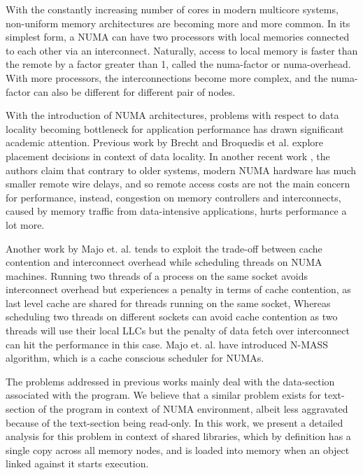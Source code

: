 
With the constantly increasing number of cores in modern multicore systems, non-uniform memory architectures
are becoming more and more common. In its simplest form, a NUMA can have two processors with local memories connected
to each other via an interconnect. Naturally, access to local memory is faster than the remote by a factor greater than 1,
called the numa-factor or numa-overhead. With more processors, the interconnections become more complex, and the numa-factor
can also be different for different pair of nodes.

With the introduction of NUMA architectures, problems with respect to data locality becoming bottleneck for application performance
has drawn significant academic attention. Previous work by Brecht\cite{Brecht:1993:IPA:1295480.1295481} and 
Broquedis et al.\cite{numaScheduling} explore placement decisions in context of data locality.
In another recent work \cite{Dashti:2013:TMH:2490301.2451157}, the authors claim that contrary to older systems,
modern NUMA hardware has much smaller remote wire delays, and so remote access costs are not the main 
concern for performance, instead, congestion on memory controllers and interconnects, caused by memory traffic 
from data-intensive applications, hurts performance a lot more.

Another work by Majo et. al. \cite{Majo:2011:MMN:1993478.1993481} tends to exploit the trade-off between cache contention
and interconnect overhead while scheduling threads on NUMA machines. Running two threads of a process on the same socket
avoids interconnect overhead but experiences a penalty in terms of cache contention, as last level cache are shared for
threads running on the same socket, Whereas scheduling two threads on different sockets can avoid cache contention
as two threads will use their local LLCs but the penalty of data fetch over interconnect can hit the performance in this case.
Majo et. al. \cite{Majo:2011:MMN:1993478.1993481} have introduced N-MASS algorithm, which is a cache conscious scheduler for NUMAs.

The problems addressed in previous works mainly deal with the data-section associated with the program. We believe that
a similar problem exists for text-section of the program in context of NUMA environment, albeit less aggravated
because of the text-section being read-only. In this work, we present a detailed analysis for this problem in context of
shared libraries, which by definition has a single copy across all memory nodes, and is loaded into memory when an object
linked against it starts execution.


